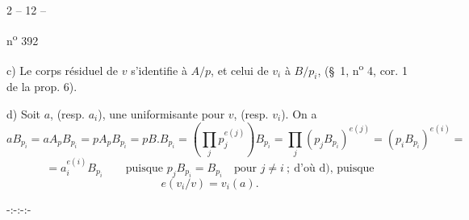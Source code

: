 \begin{center}2 -- 12 --\end{center}
\begin{flushright}n\textsuperscript{o} 392\end{flushright}

c) Le corps résiduel de $v$ s'identifie à $A/p$, et celui de $v_i$ à $B/p_i$, (\S\ 1, n\textsuperscript{o} 4, cor. 1 de la prop. 6).

d) Soit $a$, (resp. $a_i$), une uniformisante pour $v$, (resp. $v_i$). On a
\[
 aB_{p_i}=aA_pB_{p_i}=pA_pB_{p_i}=pB.B_{p_i}
 =(\prod_j p_j^{e(j)})B_{p_i}
 =\prod_j(p_jB_{p_i})^{e(j)}=(p_iB_{p_i})^{e(i)}=
\]
\[
 =a_i^{e(i)}B_{p_i}\qquad\text{puisque }p_jB_{p_i}=B_{p_i}\quad\text{pour }j\ne i\ ;\ \text{d'où d), puisque}
\]
\[
 e(v_i/v)=v_i(a).
\]
\begin{center}-:-:-:-\end{center}
